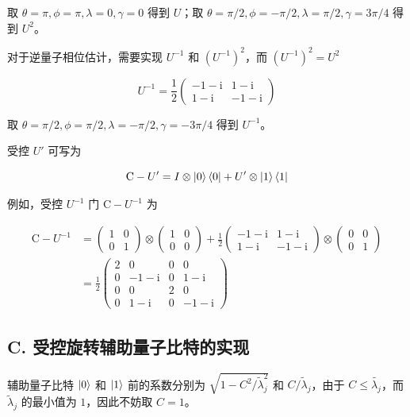 \documentclass[aps,prl,twocolumn,groupedaddress]{revtex4-2}
\begin{document}
取 $\theta=\pi,\phi=\pi,\lambda=0,\gamma=0$ 得到 $U$；取 $\theta=\pi/2,\phi=-\pi/2,\lambda=\pi/2,\gamma=3\pi/4$ 得到 $U^2$。

对于逆量子相位估计，需要实现 $U^{-1}$ 和 $\left(U^{-1} \right)^2$，而 $\left(U^{-1} \right)^2=U^2$

$$
U^{-1}
=\frac{1 }{2 } \begin{pmatrix}
-1-\mathrm{i} &1-\mathrm{i} \\
1-\mathrm{i} &-1-\mathrm{i}
\end{pmatrix}
$$

取 $\theta=\pi/2,\phi=\pi/2,\lambda=-\pi/2,\gamma=-3\pi/4$ 得到 $U^{-1}$。

受控 $U'$ 可写为

$$
\mathrm{C}-U'=I\otimes\ket{0}\bra{0} + U'\otimes \ket{1}\bra{1}
$$

例如，受控 $U^{-1}$ 门 $\mathrm{C}-U^{-1}$ 为

$$
\begin{aligned}
\mathrm{C}-U^{-1}
&=\begin{pmatrix}
1 &0 \\
0 &1
\end{pmatrix}\otimes
\begin{pmatrix}
1 &0 \\
0 &0
\end{pmatrix} + \frac{1 }{2 } 
\begin{pmatrix}
-1-\mathrm{i} &1-\mathrm{i} \\
1-\mathrm{i} &-1-\mathrm{i}
\end{pmatrix}\otimes
\begin{pmatrix}
0 &0 \\
0 &1
\end{pmatrix} \\
&=\frac{1 }{2 } 
\begin{pmatrix}
2 &0 &0 &0 \\
0 &-1-\mathrm{i} &0 &1-\mathrm{i} \\
0 &0 &2 &0 \\
0 &1-\mathrm{i} &0 &-1-\mathrm{i}
\end{pmatrix}
\end{aligned}
$$

\subsection{C. 受控旋转辅助量子比特的实现}

辅助量子比特 $\ket{0}$ 和 $\ket{1}$ 前的系数分别为 $\sqrt{1-C^2/\tilde{\lambda}_j^2}$ 和 $C/\tilde{\lambda}_j$，由于 $C\leq \tilde{\lambda_j}$，而 $\tilde{\lambda}_j$ 的最小值为 $1$，因此不妨取 $C=1$。
\end{document}
